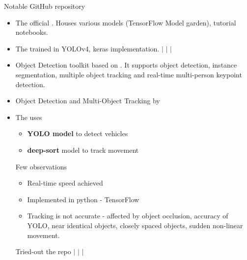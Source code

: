 \documentclass{beamer}
\newcommand{\link}[2]{\href{#1}{\textit{\color{blue}{#2}}}}%
\begin{document}
	\begin{frame}[allowframebreaks]{Notable GitHub repository}
		\begin{itemize}
			\item The official \link{https://github.com/ahmetozlu/tensorflow\_object\_counting\_api}{TensorFlow object counting api}. Houses various models (TensorFlow Model garden), tutorial notebooks. 
			
			\item The \link{https://github.com/taipingeric/yolo-v4-tf.keras}{taipingeric/yolo-v4-tf.keras} trained in YOLOv4, keras implementation. \link{https://github.com/Project-Dragon-Fly/tutorial-trials/blob/tutorial\_testing/Colab/YOLO-v4-tf-keras.ipynb}{notebook} $|$ \link{https://drive.google.com/file/d/16xsOZQjN-lKYAu7g7dlDvQIyyQhyfaBk/view?usp=sharing}{video1} $|$
			\link{https://drive.google.com/file/d/1ANPDVv4ZV2bVCmAM9H7SVpTrf3Pj9CIf/view?usp=sharing}{video2} $|$
			\link{https://drive.google.com/file/d/1-6vzo6-AmHlTGrR0W20heivqQ1uCJUQe/view?usp=sharing}{video3}
			
			\item Object Detection toolkit based on \link{https://github.com/PaddlePaddle/PaddleDetection}{PaddlePaddle}. It supports object detection, instance segmentation, multiple object tracking and real-time multi-person keypoint detection.
			
			\item Object Detection and Multi-Object Tracking by \link{https://github.com/yehengchen/Object-Detection-and-Tracking}{yehengchen}
			
			\break
			\item The \link{https://github.com/theAIGuysCode/yolov4-deepsort.git}{theAIGuysCode} uses 
			\begin{itemize}
				\item \textbf{YOLO model} to detect vehicles
				\item \textbf{deep-sort} model to track movement
			\end{itemize}
			Few observations
			\begin{itemize}
				\item Real-time speed achieved
				\item Implemented in python - TensorFlow
				\item Tracking is not accurate - affected by object occlusion, accuracy of YOLO, near identical objects, closely spaced objects, sudden non-linear movement.
			\end{itemize}
			Tried-out the repo \link{https://github.com/Project-Dragon-Fly/tutorial-trials/blob/tutorial\_testing/Colab/obj\%20detection\%20and\%20tracking.ipynb}{notebook} $|$ \link{https://drive.google.com/file/d/172r\_jCelsVzNxqjhgWjvTbXkcNGTN4Yl/view?usp=sharing}{video1} $|$ \link{https://drive.google.com/file/d/1EwC8sfuPR-gbwt8udMf6tlxATn6Ud3oA/view?usp=sharing}{video2} $|$
			\link{https://drive.google.com/file/d/1-4hTbPk6xC-Cb58G2ZXE6qi6WpWuD-XT/view?usp=sharing}{video3}	
		\end{itemize}
	\end{frame}
\end{document}
